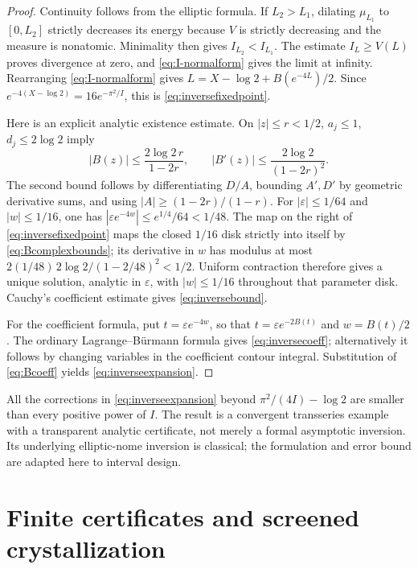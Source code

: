 \documentclass[11pt,a4paper]{article}
\theoremstyle{definition}
\theoremstyle{remark}
\begin{document}
\begin{proof}
Continuity follows from the elliptic formula. If $L_2>L_1$, dilating
$\mu_{L_1}$ to $[0,L_2]$ strictly decreases its energy because $V$ is
strictly decreasing and the measure is nonatomic. Minimality then gives
$I_{L_2}<I_{L_1}$. The estimate $I_L\ge V(L)$ proves divergence at zero,
and \eqref{eq:I-normalform} gives the limit at infinity.
Rearranging \eqref{eq:I-normalform} gives
$L=X-\log2+B(e^{-4L})/2$. Since
$e^{-4(X-\log2)}=16e^{-\pi^2/I}$, this is \eqref{eq:inversefixedpoint}.

Here is an explicit analytic existence estimate. On $|z|\le r<1/2$,
$a_j\le1$, $d_j\le2\log2$ imply
\begin{equation}
 |B(z)|\le\frac{2\log2\,r}{1-2r},\qquad
 |B'(z)|\le\frac{2\log2}{(1-2r)^2}.
 \label{eq:Bcomplexbounds}
\end{equation}
The second bound follows by differentiating $D/A$, bounding $A',D'$ by
geometric derivative sums, and using $|A|\ge(1-2r)/(1-r)$.
For $|\varepsilon|\le1/64$ and $|w|\le1/16$, one has
$|\varepsilon e^{-4w}|\le e^{1/4}/64<1/48$.
The map on the right of \eqref{eq:inversefixedpoint} maps the closed
$1/16$ disk strictly into itself by \eqref{eq:Bcomplexbounds}; its derivative
in $w$ has modulus at most
$2(1/48)\,2\log2/(1-2/48)^2<1/2$.
Uniform contraction therefore gives a unique solution, analytic in
$\varepsilon$, with $|w|\le1/16$ throughout that parameter disk.
Cauchy's coefficient estimate gives \eqref{eq:inversebound}.

For the coefficient formula, put $t=\varepsilon e^{-4w}$, so that
$t=\varepsilon e^{-2B(t)}$ and $w=B(t)/2$. The ordinary
Lagrange--B\"urmann formula gives \eqref{eq:inversecoeff}; alternatively it
follows by changing variables in the coefficient contour integral.
Substitution of \eqref{eq:Bcoeff} yields \eqref{eq:inverseexpansion}.
\end{proof}

All the corrections in \eqref{eq:inverseexpansion} beyond
$\pi^2/(4I)-\log2$ are smaller than every positive power of $I$.
The result is a convergent transseries example with a transparent analytic
certificate, not merely a formal asymptotic inversion. Its underlying
elliptic-nome inversion is classical; the formulation and error bound are
adapted here to interval design.

\section{Finite certificates and screened crystallization}
\label{sec:finite}
\end{document}
